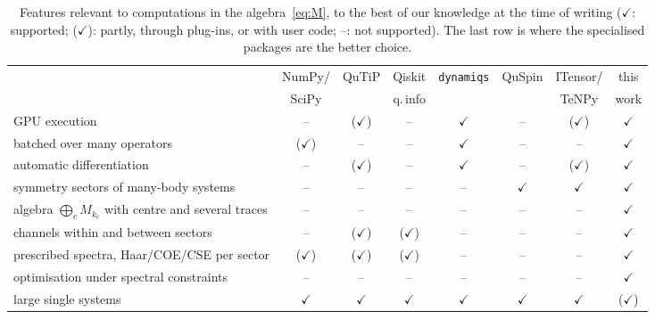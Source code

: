 \documentclass[11pt]{article}
\begin{document}
\begin{table}[h]
\centering\footnotesize
\setlength{\tabcolsep}{3pt}
\begin{tabular}{lccccccc}
\toprule
 & NumPy/ & QuTiP & Qiskit & \texttt{dynamiqs} & QuSpin & ITensor/ & this\\
 & SciPy & & q.\,info & & & TeNPy & work\\
\midrule
GPU execution & -- & ($\checkmark$) & -- & $\checkmark$ & -- & ($\checkmark$) & $\checkmark$\\
batched over many operators & ($\checkmark$) & -- & -- & $\checkmark$ & -- & -- & $\checkmark$\\
automatic differentiation & -- & ($\checkmark$) & -- & $\checkmark$ & -- & ($\checkmark$) & $\checkmark$\\
symmetry sectors of many-body systems & -- & -- & -- & -- & $\checkmark$ & $\checkmark$ & $\checkmark$\\
algebra $\bigoplus_cM_{k_c}$ with centre and several traces & -- & -- & -- & -- & -- & -- & $\checkmark$\\
channels within and between sectors & -- & ($\checkmark$) & ($\checkmark$) & -- & -- & -- & $\checkmark$\\
prescribed spectra, Haar/COE/CSE per sector & ($\checkmark$) & ($\checkmark$) & ($\checkmark$) & -- & -- & -- & $\checkmark$\\
optimisation under spectral constraints & -- & -- & -- & -- & -- & -- & $\checkmark$\\
large single systems & $\checkmark$ & $\checkmark$ & $\checkmark$ & $\checkmark$ & $\checkmark$ & $\checkmark$ & ($\checkmark$)\\
\bottomrule
\end{tabular}
\caption{Features relevant to computations in the algebra~\eqref{eq:M}, to the best of our knowledge at the
time of writing ($\checkmark$: supported; ($\checkmark$): partly, through plug-ins, or with user code;
--: not supported). The last row is where the specialised packages are the better choice.}
\label{tab:software}
\end{table}
\end{document}
